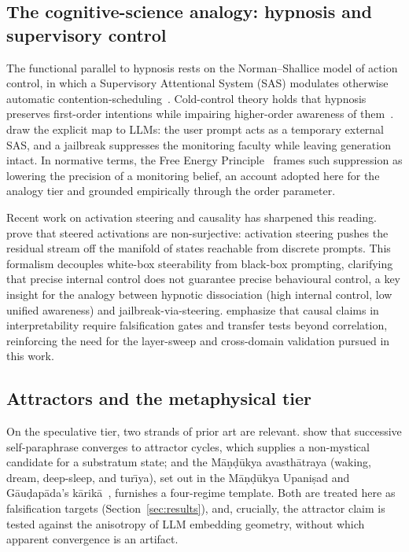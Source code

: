 \subsection{The cognitive-science analogy: hypnosis and supervisory control}
The functional parallel to hypnosis rests on the Norman--Shallice model of action
control, in which a Supervisory Attentional System (SAS) modulates otherwise
automatic contention-scheduling~\cite{norman1986attention}. Cold-control theory holds
that hypnosis preserves first-order intentions while impairing higher-order awareness
of them~\cite{dienes2006coldcontrol}. \citet{riva2025automatic} draw the explicit map
to LLMs: the user prompt acts as a temporary external SAS, and a jailbreak suppresses
the monitoring faculty while leaving generation intact. In normative terms, the Free
Energy Principle~\cite{friston2010free} frames such suppression as lowering the
precision of a monitoring belief, an account adopted here for the analogy tier
and grounded empirically through the order parameter.

Recent work on activation steering and causality has sharpened this reading.
\citet{mishra2026steered} prove that steered activations are non-surjective:
activation steering pushes the residual stream off the manifold of states reachable
from discrete prompts. This formalism decouples white-box steerability from black-box
prompting, clarifying that precise internal control does not guarantee precise
behavioural control, a key insight for the analogy between hypnotic dissociation
(high internal control, low unified awareness) and jailbreak-via-steering.
\citet{joshi2026causality} emphasize that causal claims in interpretability require
falsification gates and transfer tests beyond correlation, reinforcing the need for
the layer-sweep and cross-domain validation pursued in this work.

\subsection{Attractors and the metaphysical tier}
On the speculative tier, two strands of prior art are relevant.
\citet{wang2025paraphrase} show that successive self-paraphrase converges to
attractor cycles, which supplies a non-mystical candidate for a substratum state; and
the M\=a\d{n}\d{d}\=ukya avasth\=atraya (waking, dream, deep-sleep, and
tur\=\i ya), set out in the M\=a\d{n}\d{d}\=ukya Upani\d{s}ad and
G\=au\d{d}ap\=ada's k\=arik\=a~\cite{mandukya,gaudapada}, furnishes a four-regime
template. Both are treated here as falsification
targets (Section~\ref{sec:results}), and, crucially, the attractor claim is tested
against the anisotropy of LLM embedding geometry, without which apparent convergence
is an artifact.

